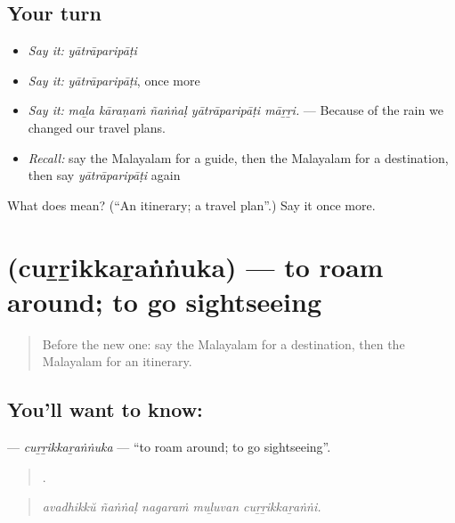 \subsection*{Your turn}
\begin{itemize}
\raggedright
  \item \emph{Say it:} \emph{yātrāparipāṭi}
  \item \emph{Say it:} \emph{yātrāparipāṭi}, once more
  \item \emph{Say it:} \emph{maḻa kāraṇaṁ ñaṅṅaḷ yātrāparipāṭi māṟṟi.} — Because of the rain we changed our travel plans.
  \item \emph{Recall:} say the Malayalam for a guide, then the Malayalam for a destination, then say \emph{yātrāparipāṭi} again
\end{itemize}

\begin{tcolorbox}[breakable,colback=teal!4,colframe=teal!35!black,title={Before you move on}]
What does  mean? (\textquotedblleft{}An itinerary; a travel plan\textquotedblright{}.) Say it once more.
\end{tcolorbox}
\section[\texorpdfstring{\ml{ചുറ്റിക്കറങ്ങുക} (cuṟṟikkaṟaṅṅuka)}{ചുറ്റിക്കറങ്ങുക (cuṟṟikkaṟaṅṅuka)}]{ (cuṟṟikkaṟaṅṅuka) — to roam around; to go sightseeing}

\label{lesson:ML-C478-currikkarannuka}



\begin{quote}
Before the new one: say the Malayalam for a destination, then the Malayalam for an itinerary.
\end{quote}

\subsection*{You'll want to know: }
\textbf{} — \emph{cuṟṟikkaṟaṅṅuka} — \textquotedblleft{}to roam around; to go sightseeing\textquotedblright{}.

\begin{quote}
    .
\end{quote}

\begin{quote}
\emph{avadhikkŭ ñaṅṅaḷ nagaraṁ muḻuvan cuṟṟikkaṟaṅṅi.}
\end{quote}

